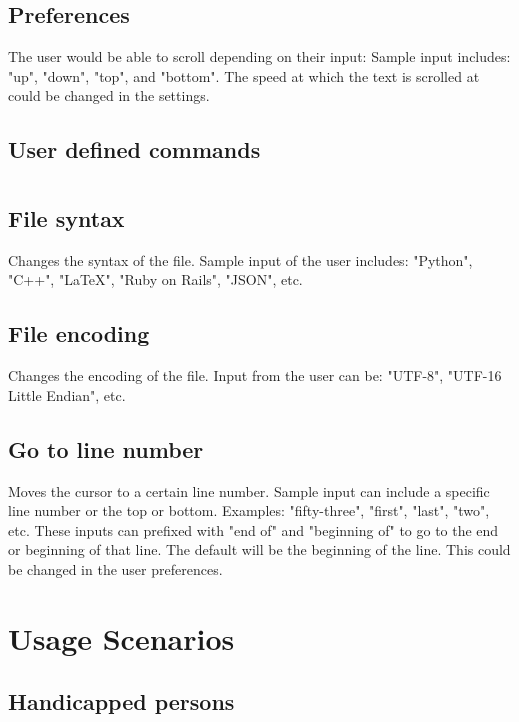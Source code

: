 \documentclass[11pt, oneside]{article}
\begin{document}
\subsection{Preferences}
The user would be able to scroll depending on their input: Sample input includes: "up", "down", "top", and "bottom". The speed at which the text is scrolled at could be changed in the settings.

\subsection{User defined commands}



\section{}

	\subsection{File syntax}
	Changes the syntax of the file. Sample input of the user includes: "Python", "C++", "\LaTeX", "Ruby on Rails", "JSON", etc.

	\subsection{File encoding}
	Changes the encoding of the file. Input from the user can be: "UTF-8", "UTF-16 Little Endian", etc.

	\subsection{Go to line number}
	Moves the cursor to a certain line number. Sample input can include a specific line number or the top or bottom. Examples: "fifty-three", "first", "last", "two", etc. These inputs can prefixed with "end of" and "beginning of" to go to the end or beginning of that line. The default will be the beginning of the line. This could be changed in the user preferences.



\section{Usage Scenarios}

\subsection{Handicapped persons}
\end{document}
